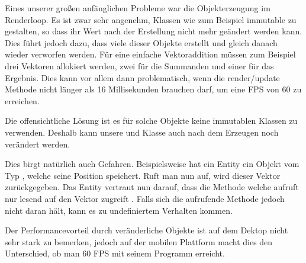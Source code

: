 
Eines unserer großen anfänglichen Probleme war die Objekterzeugung im Renderloop. Es ist zwar sehr angenehm, Klassen wie zum Beispiel  immutable  zu gestalten, so dass ihr Wert nach der Erstellung nicht mehr geändert werden kann.
Dies führt jedoch dazu, dass viele dieser Objekte erstellt und gleich danach wieder verworfen werden. Für eine einfache Vektoraddition müssen zum Beispiel drei Vektoren allokiert werden, zwei für die Summanden und einer für das Ergebnis.
Dies kann vor allem dann problematisch, wenn die render/update Methode nicht länger als 16 Millisekunden brauchen darf, um eine FPS von 60 zu erreichen.

Die offensichtliche Lösung ist es für solche Objekte keine immutablen Klassen zu verwenden. Deshalb kann unsere  und  Klasse auch nach dem Erzeugen noch verändert werden.

Dies birgt natürlich auch Gefahren. Beispielsweise hat ein Entity ein Objekt vom Typ , welche seine Position speichert. Ruft man nun  auf, wird dieser Vektor zurückgegeben. Das Entity vertraut nun darauf, dass die Methode welche  aufruft nur lesend auf den Vektor zugreift . Falls sich die aufrufende Methode jedoch nicht daran hält, kann es zu undefiniertem Verhalten kommen.

Der Performancevorteil durch veränderliche Objekte ist auf dem Dektop nicht sehr stark zu bemerken, jedoch auf der mobilen Plattform macht dies den Unterschied, ob man 60 FPS mit seinem Programm erreicht.